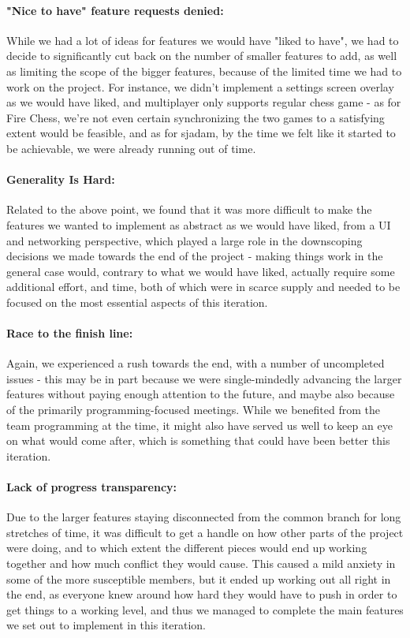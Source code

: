 \documentclass{article}
\begin{document}
\paragraph{"Nice to have" feature requests denied:} While we had a lot of ideas for features we would have "liked to have", we had to decide to significantly cut back on the number of smaller features to add, as well as limiting the scope of the bigger features, because of the limited time we had to work on the project. For instance, we didn't implement a settings screen overlay as we would have liked, and multiplayer only supports regular chess game - as for Fire Chess, we're not even certain synchronizing the two games to a satisfying extent would be feasible, and as for sjadam, by the time we felt like it started to be achievable, we were already running out of time.

\paragraph{Generality Is Hard\texttrademark:} Related to the above point, we found that it was more difficult to make the features we wanted to implement as abstract as we would have liked, from a UI and networking perspective, which played a large role in the downscoping decisions we made towards the end of the project - making things work in the general case would, contrary to what we would have liked, actually require some additional effort, and time, both of which were in scarce supply and needed to be focused on the most essential aspects of this iteration.

\paragraph{Race to the finish line:} Again, we experienced a rush towards the end, with a number of uncompleted issues - this may be in part because we were single-mindedly advancing the larger features without paying enough attention to the future, and maybe also because of the primarily programming-focused meetings. While we benefited from the team programming at the time, it might also have served us well to keep an eye on what would come after, which is something that could have been better this iteration.

\paragraph{Lack of progress transparency:} Due to the larger features staying disconnected from the common branch for long stretches of time, it was difficult to get a handle on how other parts of the project were doing, and to which extent the different pieces would end up working together and how much conflict they would cause. This caused a mild anxiety in some of the more susceptible members, but it ended up working out all right in the end, as everyone knew around how hard they would have to push in order to get things to a working level, and thus we managed to complete the main features we set out to implement in this iteration.
\end{document}
